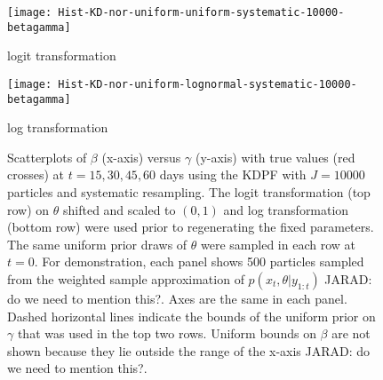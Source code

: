\documentclass{elsarticle}
\newcommand{\jarad}[1]{{\color{red}JARAD: #1}}
\begin{document}
\begin{figure}

\begin{minipage}{1.0\linewidth}
\texttt{[image: Hist-KD-nor-uniform-uniform-systematic-10000-betagamma]}
\vspace{-1.0cm}
\caption*{logit transformation}
\end{minipage}

%

\vspace{0.5cm}

\begin{minipage}{1.0\linewidth}
\texttt{[image: Hist-KD-nor-uniform-lognormal-systematic-10000-betagamma]}
\vspace{-1.0cm}
\caption*{log transformation}
\end{minipage}

%

\caption{Scatterplots of $\beta$ (x-axis) versus $\gamma$ (y-axis) with true values (red crosses) at $t = 15, 30, 45, 60$ days using the KDPF with $J = 10000$ particles and systematic resampling. The logit transformation (top row) on $\theta$ shifted and scaled to $(0,1)$ and log transformation (bottom row) were used prior to regenerating the fixed parameters. The same uniform prior draws of $\theta$ were sampled in each row at $t = 0$. For demonstration, each panel shows 500 particles sampled from the weighted sample approximation of $p(x_t,\theta|y_{1:t})$ \jarad{do we need to mention this?}. %
Axes are the same in each panel. Dashed horizontal lines indicate the bounds of the uniform prior on $\gamma$ that was used in the top two rows. Uniform bounds on $\beta$ are not shown because they lie outside the range of the x-axis \jarad{do we need to mention this?}.} \label{fig:priors}

\end{figure}
\end{document}
